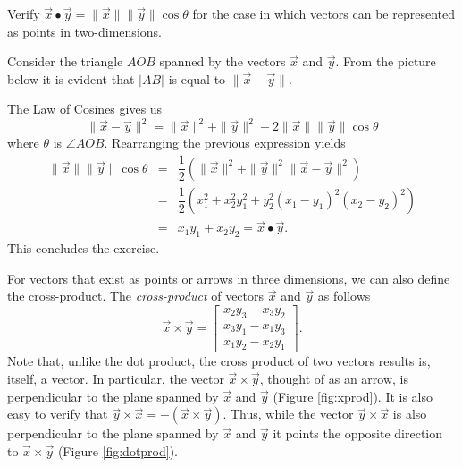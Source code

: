 \documentclass[../book.tex]{subfiles}
\begin{document}
\begin{example} \label{eg:dotprod}
Verify \(\vec{x}\bullet\vec{y} = \| \vec{x}\|  \| \vec{y}\|  \cos \theta\) for the case in which vectors can be represented as points in two-dimensions.
\end{example}
\begin{solution}
Consider the triangle \(AOB\) spanned by the vectors \(\vec{x}\) and \(\vec{y}\). From the picture below it is evident that \(|AB|\) is equal to \(\| \vec{x}-\vec{y}\|\).

\begin{center}
  \label{fig:vec-1}
\end{center}

The Law of Cosines gives us
\begin{equation}\label{eq:vec-12}
\| \vec{x}-\vec{y}\|^2
=
\| \vec{x}\|^2
+
\| \vec{y}\|^2
- 
2 \| \vec{x}\| \|\vec{y}\| \cos\theta
\end{equation}
where \(\theta\) is \(\angle AOB\). Rearranging the previous expression yields
\begin{equation}\label{eq:vec-13}
\begin{array}{lcl}
  \| \vec{x}\| \|\vec{y}\| \cos\theta 
  &=& \dfrac{1}{2} \left( \| \vec{x}\|^2 + \| \vec{y}\|^2 \| \vec{x}-\vec{y}\|^2 \right) \\[1.5ex]
  &=& \dfrac{1}{2} \left( x_1^2 + x_2^2 y_1^2 + y_2^2 (x_1-y_1)^2 (x_2-y_2)^2 \right) \\[1.5ex]
  &=& x_1 y_1 + x_2 y_2 = \vec{x} \bullet \vec{y}.
\end{array}
\end{equation}
This concludes the exercise.
\end{solution}

For vectors that exist as points or arrows in three dimensions, we can also define the cross-product. The \emph{cross-product} of vectors \(\vec{x}\) and \(\vec{y}\) as follows
\begin{equation}\label{eq:vec-14}
\vec{x}\times \vec{y}
=
\begin{bmatrix}
  x_2  y_3 - x_3 y_2 \\
  x_3 y_1 - x_1 y_3 \\
  x_1  y_2 - x_2 y_1 
\end{bmatrix}.
\end{equation}
Note that, unlike the dot product, the cross product of two vectors results is, itself, a vector. In particular, the vector \(\vec{x}\times \vec{y}\), thought of as an arrow, is perpendicular to the plane spanned by \(\vec{x}\) and \(\vec{y}\) (Figure \ref{fig:xprod}). It is also easy to verify that \(\vec{y}\times \vec{x} = - (\vec{x}\times \vec{y})\). Thus, while the vector \(\vec{y}\times \vec{x}\) is also perpendicular to the plane spanned by \(\vec{x}\) and \(\vec{y}\) it points the opposite direction to \(\vec{x} \times \vec{y}\) (Figure \ref{fig:dotprod}).
\end{document}
